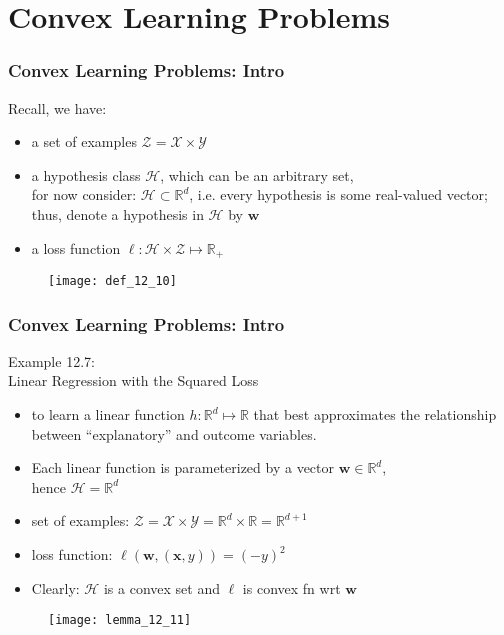 \section{Convex Learning Problems}


\begin{frame}
\frametitle{Convex Learning Problems: Intro}

Recall, we have:
\begin{itemize}
    \item a set of examples $\mathcal{Z} = \mathcal{X} \times \mathcal{Y}$
    \item a hypothesis class $\mathcal{H}$, which can be an arbitrary set,\\
    for now consider: $ \mathcal{H} \subset \mathbb{R}^d$, i.e.
    every hypothesis is some real-valued vector;
    thus, denote a hypothesis in $\mathcal{H}$ by $\mathbf{w}$
    \item a loss function $\ell: \mathcal{H} \times \mathcal{Z} \mapsto \mathbb{R_{+}}$
\end{itemize}

\begin{figure}
    \centering
    \texttt{[image: def\_12\_10]}
\end{figure}

\end{frame}

\begin{frame}
\frametitle{Convex Learning Problems: Intro}

Example 12.7: \\
Linear Regression with the Squared Loss
\begin{itemize}
    \item  to learn a linear function $h: \mathbb{R}^d \mapsto \mathbb{R}$ that best approximates
        the relationship between ``explanatory'' and outcome variables.
    \item Each linear function is parameterized by a vector $\mathbf{w} \in \mathbb{R}^d$,\\
        hence $\mathcal{H} = \mathbb{R}^d$
    \item set of examples:
    $\mathcal{Z} = \mathcal{X} \times \mathcal{Y} = \mathbb{R}^d \times \mathbb{R} = \mathbb{R}^{d+1}$
    \item loss function: $\ell(\mathbf{w}, (\mathbf{x}, y)) = (-y)^2$
    \item Clearly: $\mathcal{H}$ is a convex set and  $\ell$ is convex fn wrt $\mathbf{w}$
\end{itemize}

\begin{figure}
    \centering
    \texttt{[image: lemma\_12\_11]}
\end{figure}

\end{frame}

